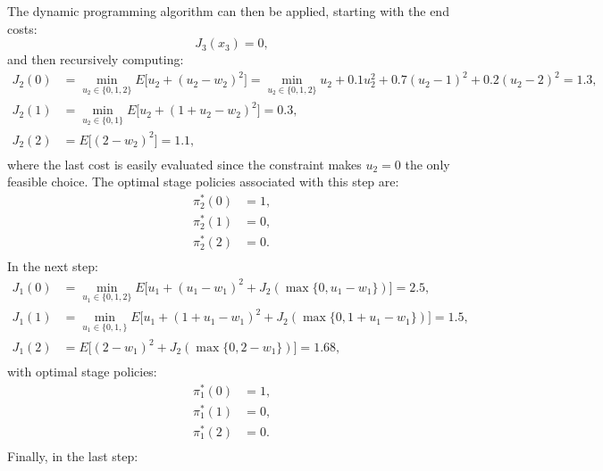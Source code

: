 \begin{example}
The dynamic programming algorithm can then be applied, starting with the end costs:
\begin{equation*}
J_3(x_3) = 0,
\end{equation*}
and then recursively computing:
\begin{equation*}
\begin{split}
J_2(0) &= \underset{u_2 \in \{0,1,2\}}{\min} E\big[u_2 + (u_2 - w_2)^2  \big] = \underset{u_2 \in \{0,1,2\}}{\min} u_2 + 0.1u_2^2 + 0.7(u_2-1)^2 + 0.2(u_2 - 2)^2 = 1.3, \\
J_2(1) &= \underset{u_2 \in \{0,1\}}{\min} E\big[u_2 + (1 + u_2 - w_2)^2  \big] = 0.3,\\
J_2(2) &= E\big[(2 - w_2)^2  \big] = 1.1, \\
\end{split}
\end{equation*}
where the last cost is easily evaluated since the constraint makes $u_2 = 0$ the only feasible choice.
The optimal stage policies associated with this step are:
\begin{equation*}
\begin{split}
\pi^*_2(0) &= 1, \\ 
\pi^*_2(1) &= 0, \\ 
\pi^*_2(2) &= 0. \\ 
\end{split}
\end{equation*}
In the next step:
\begin{equation*}
\begin{split}
J_1(0) &= \underset{u_1 \in \{0,1,2\}}{\min} E\big[u_1 + (u_1 - w_1)^2 + J_2(\max\{0, u_1 - w_1\}) \big] = 2.5, \\
J_1(1) &= \underset{u_1 \in \{0,1,\}}{\min} E\big[u_1 + (1 + u_1 - w_1)^2 + J_2(\max\{0, 1 + u_1 - w_1\})  \big] = 1.5,\\
J_1(2) &= E\big[(2 - w_1)^2  + J_2(\max\{0, 2 - w_1\}) \big] = 1.68,\\
\end{split}
\end{equation*}
with optimal stage policies:
\begin{equation*}
\begin{split}
\pi^*_1(0) &= 1, \\ 
\pi^*_1(1) &= 0, \\ 
\pi^*_1(2) &= 0. \\ 
\end{split}
\end{equation*}
Finally, in the last step:
\begin{equation*}

\end{equation*}
\end{example}
